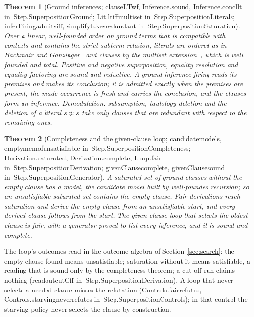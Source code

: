 \documentclass[11pt]{article}
\newtheorem{theorem}{Theorem}
\theoremstyle{remark}
\newcommand{\lean}[1]{{\ttfamily\def\_{\textunderscore\allowbreak}#1}}
\newcommand{\inmod}[1]{in~{\ttfamily\def\_{\textunderscore\allowbreak}#1}}
\begin{document}
\begin{theorem}[Ground inferences; \lean{clauseLT\_wf}, \lean{Inference.sound}, \lean{Inference.concl\_lt} \inmod{Step.SuperpositionGround}; \lean{Lit.lt\_iff\_multiset} \inmod{Step.SuperpositionLiterals}; \lean{inferFiring\_admits\_iff}, \lean{simplify\_takes\_redundant} \inmod{Step.SuperpositionSaturation}]
Over a linear, well-founded order on ground terms that is compatible with contexts and contains the
strict subterm relation, literals are ordered as in Bachmair and Ganzinger~\cite{bachmairganzinger94} and
clauses by the multiset extension~\cite{dershowitzmanna79}, which is well founded and total. Positive
and negative superposition, equality resolution and equality factoring are sound and reductive. A ground
inference firing reads its premises and makes its conclusion; it is admitted exactly when the premises
are present, the made occurrence is fresh and carries the conclusion, and the clauses form an
inference. Demodulation, subsumption, tautology deletion and the deletion of a literal $s\not\approx s$
take only clauses that are redundant with respect to the remaining ones.
\end{theorem}

\begin{theorem}[Completeness and the given-clause loop; \lean{candidate\_models}, \lean{empty\_mem\_of\_unsatisfiable} \inmod{Step.SuperpositionCompleteness}; \lean{Derivation.saturated}, \lean{Derivation.complete}, \lean{Loop.fair} \inmod{Step.SuperpositionDerivation}; \lean{givenClause\_complete}, \lean{givenClause\_sound} \inmod{Step.SuperpositionGenerator}]
A saturated set of ground clauses without the empty clause has a model, the candidate model built by
well-founded recursion; so an unsatisfiable saturated set contains the empty clause. Fair derivations
reach saturation and derive the empty clause from an unsatisfiable start, and every derived clause
follows from the start. The given-clause loop that selects the oldest clause is fair, with a generator
proved to list every inference, and it is sound and complete.
\end{theorem}

The loop's outcomes read in the outcome algebra of Section~\ref{sec:search}: the empty clause found
means unsatisfiable; saturation without it means satisfiable, a reading that is sound only by the
completeness theorem; a cut-off run claims nothing (\lean{readout\_cutOff} \inmod{Step.SuperpositionDerivation}). A loop that never selects a
needed clause misses the refutation (\lean{Controls.fair\_refutes}, \lean{Controls.starving\_never\_refutes}
\inmod{Step.SuperpositionControls}); in that control the starving policy never selects the clause by
construction.
\end{document}
